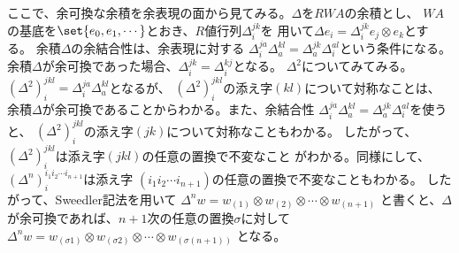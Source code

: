 	ここで、余可換な余積を余表現の面から見てみる。$\Delta$を$RWA$の余積とし、
	$WA$の基底を$\set{e_0,e_1,\cdots}$とおき、$R$値行列$\Delta_i^{jk}$を
	用いて$\Delta e_i=\Delta_i^{jk}e_j\otimes e_k$とする。
	余積$\Delta$の余結合性は、余表現に対する
	$\Delta_i^{ja}\Delta_a^{kl}=\Delta_a^{jk}\Delta_i^{al}$という条件になる。
	余積$\Delta$が余可換であった場合、$\Delta_i^{jk}=\Delta_i^{kj}$となる。
	$\Delta^2$についてみてみる。
	$(\Delta^2)_i^{jkl}=\Delta_i^{ja}\Delta_a^{kl}$となるが、
	$(\Delta^2)_i^{jkl}$の添え字$(kl)$について対称なことは、
	余積$\Delta$が余可換であることからわかる。また、余結合性
	$\Delta_i^{ja}\Delta_a^{kl}=\Delta_a^{jk}\Delta_i^{al}$を使うと、
	$(\Delta^2)_i^{jkl}$の添え字$(jk)$について対称なこともわかる。
	したがって、$(\Delta^2)_i^{jkl}$は添え字$(jkl)$の任意の置換で不変なこと
	がわかる。同様にして、$(\Delta^n)_i^{i_1i_2\cdots i_{n+1}}$は添え字
	$(i_1i_2\cdots i_{n+1})$の任意の置換で不変なこともわかる。
	したがって、Sweedler記法を用いて
	$\Delta^nw=w_{(1)}\otimes w_{(2)}\otimes\cdots\otimes w_{(n+1)}$
	と書くと、$\Delta$が余可換であれば、$n+1$次の任意の置換$\sigma$に対して
	$\Delta^nw=w_{(\sigma1)}\otimes w_{(\sigma2)}\otimes\cdots\otimes w_{\left(\sigma(n+1)\right)}$
	となる。

